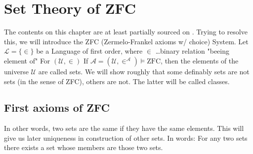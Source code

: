 \chapter{Set Theory of ZFC}
The contents on this chapter are at least partially sourced on \cite{krivine1998théorie}.
\noindent Trying to resolve this, we will introduce the ZFC (Zermelo-Frankel axioms w/ choice) System.
Let $\mathcal{L}=\{\in\}$ be a Language of first order, where $\in$ \dots binary relation "beeing element of"
For $(\mathcal{U},\in)$ 
If $\mathcal{A} = (\mathcal{U},\in^\mathcal{A})\models \text{ZFC}$, then the elements of the universe $\mathcal{U}$ are called sets.
We will show roughly that some definably sets are not sets (in the sense of ZFC), others are not. The latter will be called classes.
\section{First axioms of ZFC}
In other words, two sets are the same if they have the same elements. This will give us later uniqueness in construction of other sets.
In words: For any two sets there exists a set whose members are those two sets.



